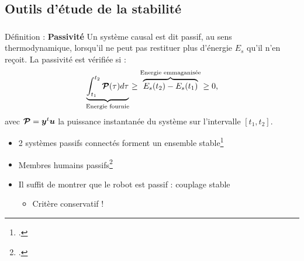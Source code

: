 \documentclass[10pt,xcolor=table]{beamer}
\begin{document}
\subsection{Outils d'étude de la stabilité}
\begin{frame}
	\frametitle{\insertsubsection}
	\begin{block}{Définition : \textbf<1>{Passivité}}
		Un système causal est dit passif, au sens thermodynamique, lorsqu’il ne peut pas restituer
		plus d’énergie $E_s$ qu’il n’en reçoit. La passivité est vérifiée si :
		\begin{equation*} 
			\underbrace{\int_{t_1}^{t_2} \matrCal{P}(\tau) d\tau}_\text{Energie fournie} \geq \overbrace{E_s(t_2) - E_s(t_1)}^\text{Energie emmaganisée} \geq 0\text{,}
		\end{equation*}
		avec $\matrCal{P} = \vect{y}^t \vect{u}$ la puissance instantanée du système sur l'intervalle $[t_1,t_2]$.
	\end{block}
	\begin{itemize}
		\item<2-> 2 systèmes passifs connectés forment un ensemble stable\footcite{colgate_robust_1988}
		\item<3-> Membres humains passifs\footcite{hogan_controlling_1989}
		\item<4->[$\Rightarrow$]  Il suffit de montrer que le robot est passif : couplage stable
		\begin{itemize}
			\item<5->[\textcolor{Shiraz}{$\blacktriangleright$}] Critère conservatif !
		\end{itemize}
	\end{itemize}
\end{frame}

\end{document}
